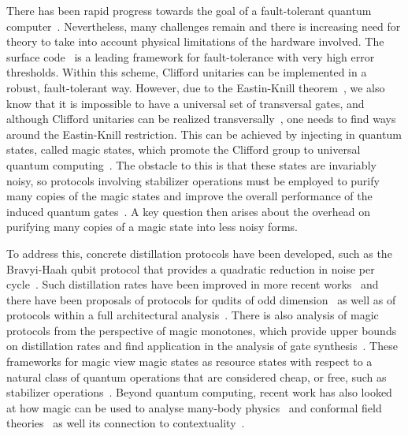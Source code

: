 \documentclass[
onecolumn,
superscriptaddress
]{revtex4-1}
\begin{document}
There has been rapid progress towards the goal of a fault-tolerant quantum computer~\cite{campbell_roads_2017, cit:raussendorf, Raussendorf_2013, Nickerson_2014, Nikahd_2017, chao_2018, lin_pieceable_2020, Lin_2020, chamberland_2020, Bourassa_2021}. Nevertheless, many challenges remain and there is increasing need for theory to take into account physical limitations of the hardware involved. The surface code~\cite{Bravyi_1998, Freedman_2001, Dennis_2002, Raussendorf_2007} is a leading framework for fault-tolerance with very high error thresholds. Within this scheme, Clifford unitaries can be implemented in a robust, fault-tolerant way. However, due to the Eastin-Knill theorem~\cite{Eastin_2009}, we also know that it is impossible to have a universal set of transversal gates, and although Clifford unitaries can be realized transversally~\cite{Calderbank_1996, Steane_1996}, one needs to find ways around the Eastin-Knill restriction. This can be achieved by injecting in quantum states, called magic states, which promote the Clifford group to universal quantum computing~\cite{cit:bravyi}. The obstacle to this is that these states are invariably noisy, so protocols involving stabilizer operations must be employed to purify many copies of the magic states and improve the overall performance of the induced quantum gates~\cite{cit:bravyi, Jones_2013, Ogorman_2017}. A key question then arises about the overhead on purifying many copies of a magic state into less noisy forms. 

To address this, concrete distillation protocols have been developed, such as the Bravyi-Haah qubit protocol that provides a quadratic reduction in noise per cycle~\cite{Bravyi2012}. Such distillation rates have been improved in more recent works~\cite{Jones_2013, haah2017magic, Hastings2018, Litinski_2019} and there have been proposals of protocols for qudits of odd dimension~\cite{CampbellAnwar_2012, Anwar_2012, Dawkins_2015, Krishna2019, cit:prakash} as well as of protocols within a full architectural analysis~\cite{chamberland_very_2020, Chamberland2019faulttolerantmagic}. There is also analysis of magic protocols from the perspective of magic monotones, which provide upper bounds on distillation rates and find application in the analysis of gate synthesis~\cite{Campbell_2017, Howard_2017, Prakash_2018, Seddon_2021,leone2021renyi}. These frameworks for magic view magic states as resource states with respect to a natural class of quantum operations that are considered cheap, or free, such as stabilizer operations~\cite{Gour_2019, cit:ahmadi, cit:seddon, Wang_2019}. Beyond quantum computing, recent work has also looked at how magic can be used to analyse many-body physics~\cite{Sarkar_2020} and conformal field theories~\cite{White_2021} as well its connection to contextuality~\cite{Vega_2017, cit:howard2, Zurel_2020, Okay_2021, schmid2020structure, Schmid_2021}.
\end{document}
